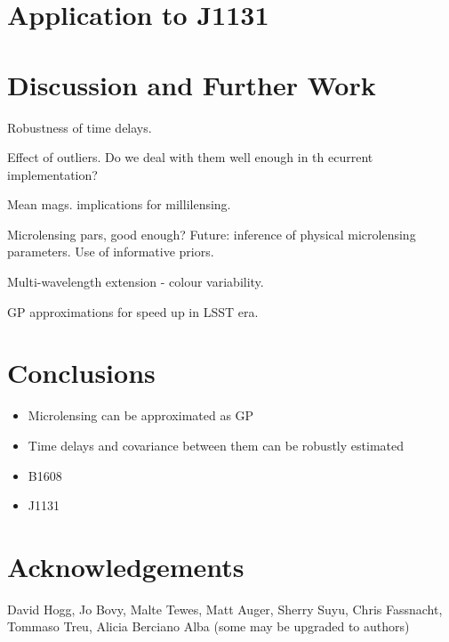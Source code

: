 \documentclass[useAMS,usenatbib, a4paper]{mn2e} \usepackage{natbib}
\begin{document}

\section{Application to J1131}

\citep{2006astro.ph..5321M}



\section{Discussion and Further Work}

Robustness of time delays.

Effect of outliers. Do we deal with them well enough in th ecurrent implementation?

Mean mags. implications for millilensing.

Microlensing pars, good enough? Future: inference of physical microlensing parameters. 
Use of informative priors.

Multi-wavelength extension - colour variability.

GP approximations for speed up in LSST era.



\section{Conclusions}

\begin{itemize}
\item Microlensing can be approximated as GP
\item Time delays and covariance between them can be robustly estimated
\item B1608
\item J1131
\end{itemize}



\section{Acknowledgements}
David Hogg, Jo Bovy, Malte Tewes, Matt Auger, Sherry Suyu, Chris Fassnacht, Tommaso Treu, Alicia Berciano Alba
(some may be upgraded to authors)
\end{document}
